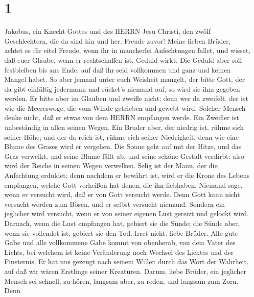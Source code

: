 \hypertarget{section}{%
\section{1}\label{section}}

 Jakobus, ein Knecht Gottes und des HERRN Jesu Christi, den
zwölf Geschlechtern, die da sind hin und her, Freude zuvor! 
Meine lieben Brüder, achtet es für eitel Freude, wenn ihr in mancherlei
Anfechtungen fallet,  und wisset, daß euer Glaube, wenn er
rechtschaffen ist, Geduld wirkt.  Die Geduld aber soll
festbleiben bis ans Ende, auf daß ihr seid vollkommen und ganz und
keinen Mangel habet.  So aber jemand unter euch Weisheit
mangelt, der bitte Gott, der da gibt einfältig jedermann und rücket's
niemand auf, so wird sie ihm gegeben werden.  Er bitte aber
im Glauben und zweifle nicht; denn wer da zweifelt, der ist wie die
Meereswoge, die vom Winde getrieben und gewebt wird. 
Solcher Mensch denke nicht, daß er etwas von dem HERRN empfangen werde.
 Ein Zweifler ist unbeständig in allen seinen Wegen.
 Ein Bruder aber, der niedrig ist, rühme sich seiner Höhe;
 und der da reich ist, rühme sich seiner Niedrigkeit, denn
wie eine Blume des Grases wird er vergehen.  Die Sonne geht
auf mit der Hitze, und das Gras verwelkt, und seine Blume fällt ab, und
seine schöne Gestalt verdirbt: also wird der Reiche in seinen Wegen
verwelken.  Selig ist der Mann, der die Anfechtung
erduldet; denn nachdem er bewährt ist, wird er die Krone des Lebens
empfangen, welche Gott verheißen hat denen, die ihn liebhaben.
 Niemand sage, wenn er versucht wird, daß er von Gott
versucht werde. Denn Gott kann nicht versucht werden zum Bösen, und er
selbst versucht niemand.  Sondern ein jeglicher wird
versucht, wenn er von seiner eigenen Lust gereizt und gelockt wird.
 Darnach, wenn die Lust empfangen hat, gebiert sie die
Sünde; die Sünde aber, wenn sie vollendet ist, gebiert sie den Tod.
 Irret nicht, liebe Brüder.  Alle gute Gabe
und alle vollkommene Gabe kommt von obenherab, von dem Vater des Lichts,
bei welchem ist keine Veränderung noch Wechsel des Lichtes und der
Finsternis.  Er hat uns gezeugt nach seinem Willen durch
das Wort der Wahrheit, auf daß wir wären Erstlinge seiner Kreaturen.
 Darum, liebe Brüder, ein jeglicher Mensch sei schnell, zu
hören, langsam aber, zu reden, und langsam zum Zorn.  Denn
